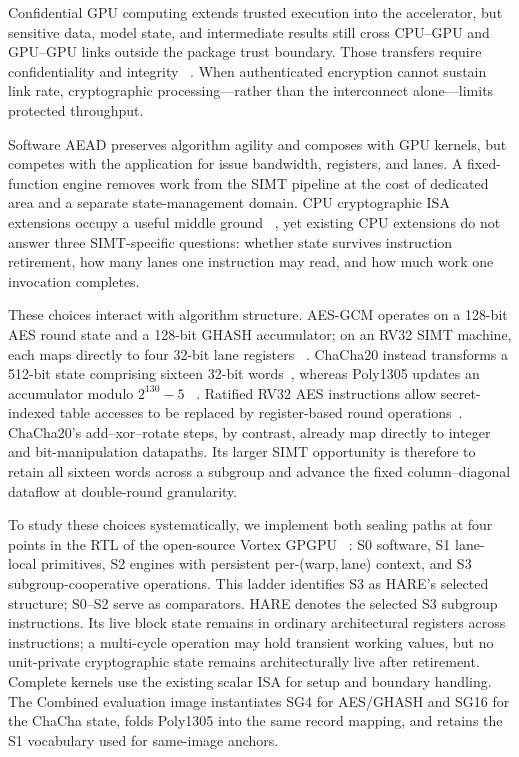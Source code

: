 \documentclass[conference]{IEEEtran}
\begin{document}
Confidential GPU computing extends trusted execution into the accelerator,
but sensitive data, model state, and intermediate results still cross
CPU--GPU and GPU--GPU links outside the package trust boundary. Those
transfers require confidentiality and integrity
~\cite{nvidia-h100-cc,wang2024fastrack,lee2025gputee}. When authenticated
encryption cannot sustain link rate, cryptographic processing---rather than
the interconnect alone---limits protected throughput.

Software AEAD preserves algorithm agility and composes with GPU kernels, but
competes with the application for issue bandwidth, registers, and lanes. A
fixed-function engine removes work from the SIMT pipeline at the cost of
dedicated area and a separate state-management domain. CPU cryptographic ISA
extensions occupy a useful middle ground
~\cite{gueron2010aesni,riscv-scalar-crypto,riscv-vector-crypto}, yet existing
CPU extensions do not answer three SIMT-specific questions: whether state
survives instruction retirement, how many lanes one instruction may read, and
how much work one invocation completes.

These choices interact with algorithm structure. AES-GCM operates on a
128-bit AES round state and a 128-bit GHASH accumulator; on an RV32 SIMT
machine, each maps directly to four 32-bit lane registers
~\cite{sp800-38d,mcgrew2004gcm}. ChaCha20 instead transforms a 512-bit state
comprising sixteen 32-bit words~\cite{rfc8439,bernstein2008chacha}, whereas
Poly1305 updates an accumulator modulo $2^{130}-5$
~\cite{rfc8439,bernstein2005poly}. Ratified RV32 AES instructions allow
secret-indexed table accesses to be replaced by register-based round
operations~\cite{riscv-scalar-crypto}. ChaCha20's add--xor--rotate steps, by
contrast, already map directly to integer and bit-manipulation datapaths. Its
larger SIMT opportunity is therefore to retain all sixteen words across a
subgroup and advance the fixed column--diagonal dataflow at double-round
granularity.

To study these choices systematically, we implement both sealing paths at
four points in the RTL of the open-source Vortex GPGPU
~\cite{tine2021vortex}: S0 software, S1 lane-local primitives, S2 engines with
persistent per-(warp,\,lane) context, and S3 subgroup-cooperative operations.
This ladder identifies S3 as HARE's selected structure; S0--S2 serve as
comparators. HARE denotes the selected S3 subgroup instructions. Its live
block state remains in ordinary architectural registers across instructions;
a multi-cycle operation may hold transient working values, but no
unit-private cryptographic state remains architecturally live after
retirement. Complete kernels use the existing scalar ISA for setup and
boundary handling. The Combined evaluation image instantiates SG4 for
AES/GHASH and SG16 for the ChaCha state, folds Poly1305 into the same record
mapping, and retains the S1 vocabulary used for same-image anchors.
\end{document}
